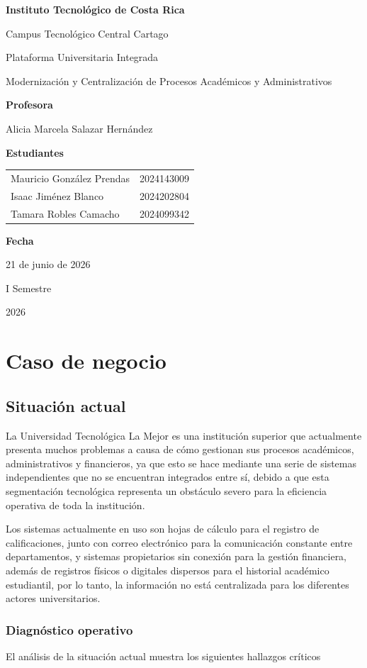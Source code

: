 \documentclass[11pt,spanish]{article}
\title{\DocumentoTitulo}
\author{\AutoresPortada}
\date{\FechaDocumento}
\makeatletter
\newcommand{\Institucion}{Instituto Tecnológico de Costa Rica}
\newcommand{\Campus}{Campus Tecnológico Central Cartago}
\newcommand{\DocumentoTitulo}{Plataforma Universitaria Integrada}
\newcommand{\DocumentoSubtitulo}{Modernización y Centralización de Procesos Académicos y Administrativos}
\newcommand{\Profesor}{Alicia Marcela Salazar Hernández}
\newcommand{\FechaDocumento}{21 de junio de 2026}
\newcommand{\PeriodoAcademico}{I Semestre}
\newcommand{\AnioDocumento}{2026}
\newcommand{\AutoresPortada}{%
    \begin{tabular}{l@{\hspace{1.5cm}}r}
        Mauricio González Prendas & 2024143009\\
        Isaac Jiménez Blanco & 2024202804\\
        Tamara Robles Camacho & 2024099342
    \end{tabular}%
}
\newcommand{\MakeCover}{%
\begin{titlepage}
\thispagestyle{empty}
\centering

{\bfseries \huge \Institucion \par}
\vspace{0.25cm}
{\LARGE \Campus \par}

\vfill

{\huge \DocumentoTitulo \par}
\vspace{0.4cm}
{\Large \DocumentoSubtitulo \par}

\vfill

{\bfseries \LARGE Profesora \par}
{\Large \Profesor \par}

\vfill

{\bfseries \LARGE Estudiantes \par}
{\Large \AutoresPortada \par}

\vfill

{\bfseries\LARGE Fecha \par}
{\Large \FechaDocumento \par}

\vfill

{\LARGE \PeriodoAcademico \par}
{\LARGE \AnioDocumento \par}

\end{titlepage}%
}
\makeatother
\begin{document}
\hypersetup{pageanchor=false}

\MakeCover

\pagestyle{empty}
\tableofcontents
\clearpage
{}
\hypersetup{pageanchor=true}
\pagestyle{fancy}


\section{Caso de negocio}

\subsection{Situación actual}

La Universidad Tecnológica La Mejor es una institución superior que actualmente presenta muchos problemas a causa de cómo gestionan sus procesos académicos, administrativos y financieros, ya que esto se hace mediante una serie de sistemas independientes que no se encuentran integrados entre sí, debido a que esta segmentación tecnológica representa un obstáculo severo para la eficiencia operativa de toda la institución.

Los sistemas actualmente en uso son hojas de cálculo para el registro de calificaciones, junto con correo electrónico para la comunicación constante entre departamentos, y sistemas propietarios sin conexión para la gestión financiera, además de registros físicos o digitales dispersos para el historial académico estudiantil, por lo tanto, la información no está centralizada para los diferentes actores universitarios.

\subsubsection{Diagnóstico operativo}

El análisis de la situación actual muestra los siguientes hallazgos críticos
\end{document}
